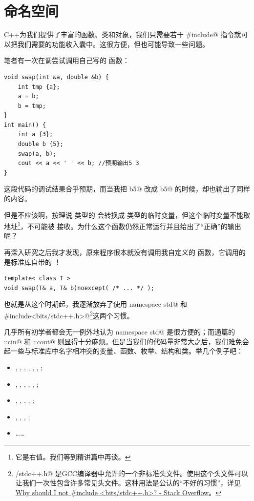 \section{命名空间}
C++为我们提供了丰富的函数、类和对象，我们只需要若干 \lstinline@#include@ 指令就可以把我们需要的功能收入囊中。这很方便，但也可能导致一些问题。\par
笔者有一次在调尝试调用自己写的 \lstinline@swap@ 函数：
\begin{lstlisting}
void swap(int &a, double &b) {
    int tmp {a};
    a = b;
    b = tmp;
}
int main() {
    int a {3};
    double b {5};
    swap(a, b);
    cout << a << ' ' << b; //预期输出5 3
}
\end{lstlisting}
这段代码的调试结果合乎预期，而当我把 \lstinline@double b{5}@ 改成 \lstinline@int b{5}@ 的时候，却也输出了同样的内容。\par
但是不应该啊，按理说 \lstinline@int@ 类型的 \lstinline@b@ 会转换成 \lstinline@double@ 类型的临时变量，但这个临时变量不能取地址\footnote{它是右值。我们等到精讲篇中再谈。}，不可能被 \lstinline@swap@ 接收。为什么这个函数仍然正常运行并且给出了``正确''的输出呢？\par
再深入研究之后我才发现，原来程序很本就没有调用我自定义的 \lstinline@swap@ 函数，它调用的是标准库自带的 \lstinline@swap@！
\begin{lstlisting}
template< class T >
void swap(T& a, T& b)noexcept( /* ... */ );
\end{lstlisting}
也就是从这个时期起，我逐渐放弃了使用 \lstinline@using namespace std@ 和 \lstinline@#include<bits/stdc++.h>@\footnote{\lstinline@bits/stdc++.h@ 是GCC编译器中允许的一个非标准头文件。使用这个头文件可以让我们一次性包含许多常见头文件。这种用法是公认的``不好的习惯''，详见\href{https://stackoverflow.com/questions/31816095/why-should-i-not-include-bits-stdc-h}{Why should I not \#include <bits/stdc++.h>? - Stack Overflow}。}这两个习惯。\par
几乎所有初学者都会无一例外地认为 \lstinline@using namespace std@ 是很方便的；而通篇的 \lstinline@std::cin@ 和 \lstinline@std::cout@ 则显得十分麻烦。但是当我们的代码量非常大之后，我们难免会起一些与标准库中名字相冲突的变量、函数、枚举、结构和类。举几个例子吧：
\begin{itemize}
    \item \lstinline@list@, \lstinline@map@, \lstinline@array@, \lstinline@queue@, \lstinline@set@, \lstinline@string@, \lstinline@pair@;
    \item \lstinline@copy@, \lstinline@find@, \lstinline@move@, \lstinline@search@, \lstinline@count@, \lstinline@sample@;
    \item \lstinline@next@, \lstinline@begin@, \lstinline@end@, \lstinline@data@, \lstinline@size@;
    \item \lstinline@function@, \lstinline@future@, \lstinline@thread@, \lstinline@yield@;
    \item \ldots\ldots
\end{itemize}
